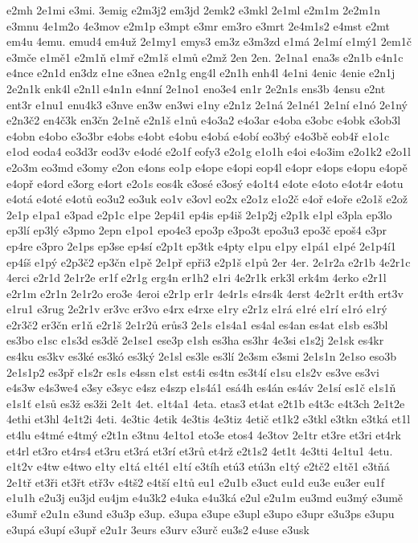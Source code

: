 e2mh
2e1mi
e3mi.
3emig
e2m3j2
em3jd
2emk2
e3mkl
2e1ml
e2m1m
2e2m1n
e3mnu
4e1m2o
4e3mov
e2m1p
e3mpt
e3mr
em3ro
e3mrt
2e4m1s2
e4mst
e2mt
em4u
4emu.
emud4
em4už
2e1my1
emys3
em3z
e3m3zd
e1má
2e1mí
e1mý1
2em1č
e3mče
e1mě1
e2m1ň
e1mř
e2m1š
e1mů
e2mž
2en
2en.
2e1na1
ena3s
e2n1b
e4n1c
e4nce
e2n1d
en3dz
e1ne
e3nea
e2n1g
eng4l
e2n1h
enh4l
4e1ni
4enic
4enie
e2n1j
2e2n1k
enk4l
e2n1l
e4n1n
e4nní
2e1no1
eno3e4
en1r
2e2n1s
ens3b
4ensu
e2nt
ent3r
e1nu1
enu4k3
e3nve
en3w
en3wi
e1ny
e2n1z
2e1ná
2e1né1
2e1ní
e1nó
2e1ný
e2n3č2
en4č3k
en3čn
2e1ně
e2n1š
e1nů
e4o3a2
e4o3ar
e4oba
e3obc
e4obk
e3ob3l
e4obn
e4obo
e3o3br
e4obs
e4obt
e4obu
e4obá
e4obí
eo3bý
e4o3bě
eob4ř
e1o1c
e1od
eoda4
eo3d3r
eod3v
e4odé
e2o1f
eofy3
e2o1g
e1o1h
e4oi
e4o3im
e2o1k2
e2o1l
e2o3m
eo3md
e3omy
e2on
e4ons
eo1p
e4ope
e4opi
eop4l
e4opr
e4ops
e4opu
e4opě
e4opř
e4ord
e3org
e4ort
e2o1s
eos4k
e3osé
e3osý
e4o1t4
e4ote
e4oto
e4ot4r
e4otu
e4otá
e4oté
e4otů
eo3u2
eo3uk
eo1v
e3ovl
eo2x
e2o1z
e1o2č
e4oř
e4oře
e2o1š
e2ož
2e1p
e1pa1
e3pad
e2p1c
e1pe
2ep4i1
ep4is
ep4iš
2e1p2j
e2p1k
e1pl
e3pla
ep3lo
ep3lí
ep3lý
e3pmo
2epn
e1po1
epo4e3
epo3p
e3po3t
epo3u3
epo3č
epoš4
e3pr
ep4re
e3pro
2e1ps
ep3se
ep4sí
e2p1t
ep3tk
e4pty
e1pu
e1py
e1pá1
e1pé
2e1p4í1
ep4íš
e1pý
e2p3č2
ep3čn
e1pě
2e1př
epři3
e2p1š
e1pů
2er
4er.
2e1r2a
e2r1b
4e2r1c
4erci
e2r1d
2e1r2e
er1f
e2r1g
erg4n
er1h2
e1ri
4e2r1k
erk3l
erk4m
4erko
e2r1l
e2r1m
e2r1n
2e1r2o
ero3e
4eroi
e2r1p
er1r
4e4r1s
e4rs4k
4erst
4e2r1t
er4th
ert3v
e1ru1
e3rug
2e2r1v
er3vc
er3vo
e4rx
e4rxe
e1ry
e2r1z
e1rá
e1ré
e1rí
e1ró
e1rý
e2r3č2
er3čn
er1ň
e2r1š
2e1r2ů
erůs3
2e1s
e1s4a1
es4al
es4an
es4at
e1sb
es3bl
es3bo
e1sc
e1s3d
es3dě
2e1se1
ese3p
e1sh
es3ha
es3hr
4e3si
e1s2j
2e1sk
es4kr
es4ku
es3kv
es3ké
es3kó
es3ký
2e1sl
es3le
es3lí
2e3sm
e3smi
2e1s1n
2e1so
eso3b
2e1s1p2
es3př
e1s2r
es1s
e4ssn
e1st
est4i
es4tn
es3t4í
e1su
e1s2v
es3ve
es3vi
e4s3w
e4s3we4
e3sy
e3syc
e4sz
e4szp
e1s4á1
esá4h
es4án
es4áv
2e1sí
es1č
e1s1ň
e1s1ť
e1sů
es3ž
es3ži
2e1t
4et.
e1t4a1
4eta.
etas3
et4at
e2t1b
e4t3c
e4t3ch
2e1t2e
4ethi
et3hl
4e1t2i
4eti.
4e3tic
4etik
4e3tis
4e3tiz
4etič
et1k2
e3tkl
e3tkn
e3tká
et1l
et4lu
e4tmé
e4tmý
e2t1n
e3tnu
4e1to1
eto3e
etos4
4e3tov
2e1tr
et3re
et3ri
et4rk
et4rl
et3ro
et4rs4
et3ru
et3rá
et3rí
et3rů
et4rž
e2t1s2
4et1t
4e3tti
4e1tu1
4etu.
e1t2v
e4tw
e4two
e1ty
e1tá
e1té1
e1tí
e3tíh
etú3
etú3n
e1tý
e2tč2
e1tě1
e3tňá
2e1tř
et3ři
et3řt
etř3v
e4tš2
e4tší
e1tů
eu1
e2u1b
e3uct
eu1d
eu3e
eu3er
eu1f
e1u1h
e2u3j
eu3jd
eu4jm
e4u3k2
e4uka
e4u3ká
e2ul
e2u1m
eu3md
eu3mý
e3umě
e3umř
e2u1n
e3und
e3u3p
e3up.
e3upa
e3upe
e3upl
e3upo
e3upr
e3u3ps
e3upu
e3upá
e3upí
e3upř
e2u1r
3eurs
e3urv
e3urč
eu3s2
e4use
e3usk
